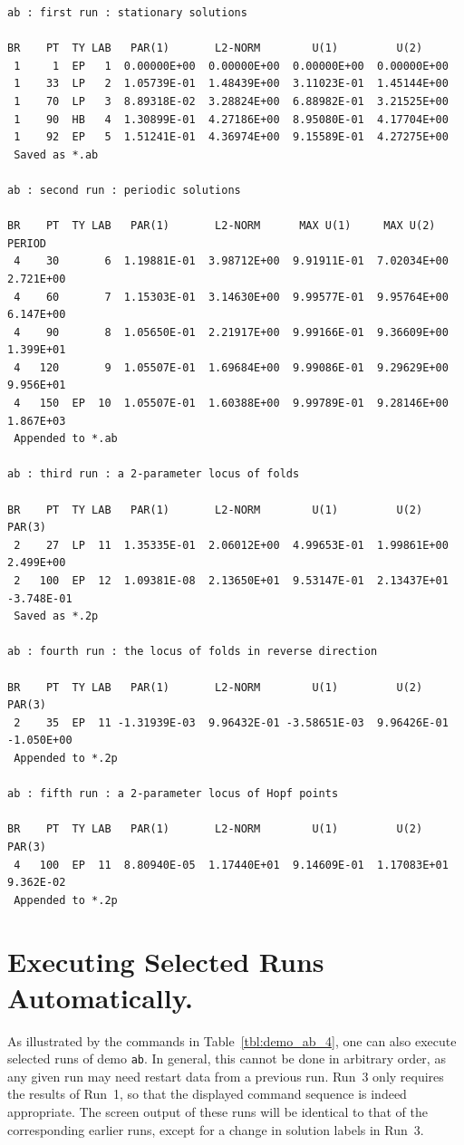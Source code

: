 \documentclass[12pt]{report}
\begin{document}
\newpage
\begin{center}
\begin{verbatim}
ab : first run : stationary solutions
 
BR    PT  TY LAB   PAR(1)       L2-NORM        U(1)         U(2)     
 1     1  EP   1  0.00000E+00  0.00000E+00  0.00000E+00  0.00000E+00
 1    33  LP   2  1.05739E-01  1.48439E+00  3.11023E-01  1.45144E+00
 1    70  LP   3  8.89318E-02  3.28824E+00  6.88982E-01  3.21525E+00
 1    90  HB   4  1.30899E-01  4.27186E+00  8.95080E-01  4.17704E+00
 1    92  EP   5  1.51241E-01  4.36974E+00  9.15589E-01  4.27275E+00
 Saved as *.ab
 
ab : second run : periodic solutions
 
BR    PT  TY LAB   PAR(1)       L2-NORM      MAX U(1)     MAX U(2)     PERIOD    
 4    30       6  1.19881E-01  3.98712E+00  9.91911E-01  7.02034E+00  2.721E+00
 4    60       7  1.15303E-01  3.14630E+00  9.99577E-01  9.95764E+00  6.147E+00
 4    90       8  1.05650E-01  2.21917E+00  9.99166E-01  9.36609E+00  1.399E+01
 4   120       9  1.05507E-01  1.69684E+00  9.99086E-01  9.29629E+00  9.956E+01
 4   150  EP  10  1.05507E-01  1.60388E+00  9.99789E-01  9.28146E+00  1.867E+03
 Appended to *.ab
 
ab : third run : a 2-parameter locus of folds
 
BR    PT  TY LAB   PAR(1)       L2-NORM        U(1)         U(2)       PAR(3)     
 2    27  LP  11  1.35335E-01  2.06012E+00  4.99653E-01  1.99861E+00  2.499E+00
 2   100  EP  12  1.09381E-08  2.13650E+01  9.53147E-01  2.13437E+01 -3.748E-01
 Saved as *.2p
 
ab : fourth run : the locus of folds in reverse direction
 
BR    PT  TY LAB   PAR(1)       L2-NORM        U(1)         U(2)       PAR(3)     
 2    35  EP  11 -1.31939E-03  9.96432E-01 -3.58651E-03  9.96426E-01 -1.050E+00
 Appended to *.2p
 
ab : fifth run : a 2-parameter locus of Hopf points
 
BR    PT  TY LAB   PAR(1)       L2-NORM        U(1)         U(2)       PAR(3)     
 4   100  EP  11  8.80940E-05  1.17440E+01  9.14609E-01  1.17083E+01  9.362E-02
 Appended to *.2p
\end{verbatim}
\end{center}

\newpage

\section{ Executing Selected Runs Automatically.} \label{sec:Tutorial_selected_runs}
As illustrated by the commands in Table~\ref{tbl:demo_ab_4}, 
one can also execute selected runs of demo {\tt ab}.
In general, this cannot be done in arbitrary order, as any given
run may need restart data from a previous run.
Run~3 only requires the results of Run~1, so that the displayed 
command sequence is indeed appropriate.
The screen output of these runs will be identical to that of
the corresponding earlier runs, except for a change in solution labels in Run~3.
\end{document}
